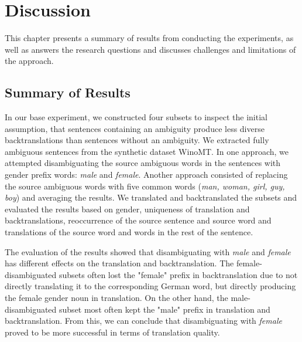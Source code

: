 \chapter{Discussion}
\label{ch:Discussion}

This chapter presents a summary of results from conducting the experiments, as well as answers the research questions and discusses challenges and limitations of the approach. 


\section{Summary of Results}
\label{sec:Discussion:Summary}

In our base experiment, we constructed four subsets to inspect the initial assumption, that sentences containing an ambiguity produce less diverse backtranslations than sentences without an ambiguity. We extracted fully ambiguous sentences from the synthetic dataset WinoMT. In one approach, we attempted disambiguating the source ambiguous words in the sentences with gender prefix words: \textit{male} and \textit{female}. Another approach consisted of replacing the source ambiguous words with five common words (\textit{man, woman, girl, guy, boy}) and averaging the results. We translated and backtranslated the subsets and evaluated the results based on gender, uniqueness of translation and backtranslations, reoccurrence of the source sentence and source word and translations of the source word and words in the rest of the sentence.

The evaluation of the results showed that disambiguating with \textit{male} and \textit{female} has different effects on the translation and backtranslation. The female-disambiguated subsets often lost the "female" prefix in backtranslation due to not directly translating it to the corresponding German word, but directly producing the female gender noun in translation. On the other hand, the male-disambiguated subset most often kept the "male" prefix in translation and backtranslation. From this, we can conclude that disambiguating with \textit{female} proved to be more successful in terms of translation quality.


